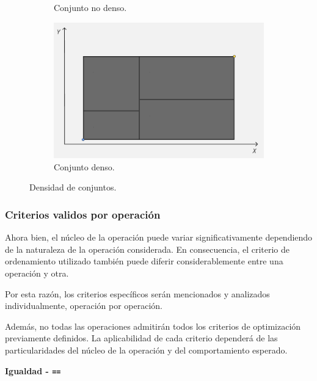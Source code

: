 \begin{figure}[h]
\begin{subfigure}[b]{0.42\linewidth}
        \caption{Conjunto no denso.}
        \label{fig:crit-suma-max}
    \end{subfigure}
    \hfill
    \vspace{0,5cm}
    \begin{subfigure}[b]{0.42\linewidth}
        \centering
        \includegraphics[width=\linewidth]{figures/optimizaciones pwmap/op simils/denso3.png}
        \caption{Conjunto denso.}
        \label{fig:crit-suma-min}
    \end{subfigure}
    \caption{Densidad de conjuntos.}
    \label{fig:crit-suma}
\end{figure}





\subsubsection{Criterios validos por operación}

Ahora bien, el núcleo de la operación puede variar significativamente dependiendo de la naturaleza de la operación considerada. En consecuencia, el criterio de ordenamiento utilizado también puede diferir considerablemente entre una operación y otra. 

Por esta razón, los criterios específicos serán mencionados y analizados individualmente, operación por operación. 

Además, no todas las operaciones admitirán todos los criterios de optimización previamente definidos. La aplicabilidad de cada criterio dependerá de las particularidades del núcleo de la operación y del comportamiento esperado.


\textbf{Igualdad - \texttt{==}}

